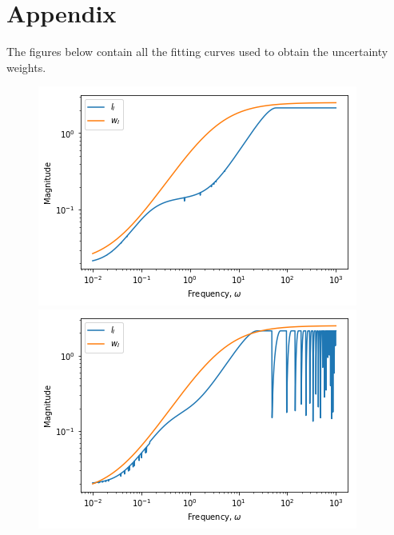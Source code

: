 \section{Appendix}

The figures below contain all the fitting curves used to obtain the uncertainty weights.

\begin{figure}[H]
	\centering
	\begin{minipage}{.48\textwidth}
		\centering
		\includegraphics[width=\linewidth]{Figures/Uncertainty_wI_11}
	\end{minipage}%
	\hfill
	\begin{minipage}{.48\textwidth}
		\centering
		\includegraphics[width=\linewidth]{Figures/Uncertainty_wI_12}
	\end{minipage}
\end{figure}


